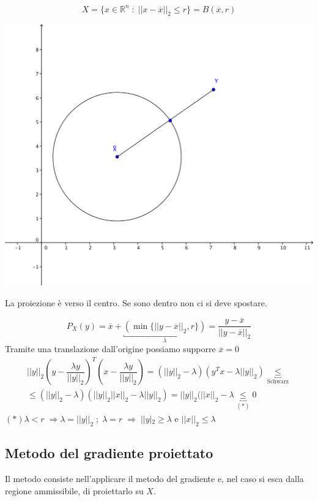 \begin{example}[Sfera]
$$
X  = \{ x \in \mathbb{R}^{n} \; : \;
|| x - \overline{x}||_{2} \leq r \} = B(\overline{x},r)
$$

\begin{center}
  \includegraphics[scale=0.6]{imgs/sferavincolo.png}
\end{center}

La proiezione \`e verso il centro.
Se sono dentro non ci si deve spostare.

$$P_{X}(y) = \overline{x} + \underbracket{(\min \{ || y - \overline{x}||_{2},r\})}_{\lambda} =
\dfrac{y-\overline{x}}{||y - \overline{x} ||_{2}}
$$
Tramite una translazione dall'origine possiamo supporre $\overline{x}=0$
$$
\begin{array}{l}
|| y||_{2} (y - \dfrac{\lambda y}{ ||y||_{2}})^{T}
(x - \dfrac{\lambda y}{ ||y||_{2}}) = 
(||y||_{2} - \lambda) (y^{T}x - \lambda ||y||_{2})
\underbracket{\leq}_{\text{Schwarz}} \\
\leq (||y||_{2}-\lambda)(||y||_{2} ||x||_{2} - \lambda||y||_{2})
= ||y||_{2} (||x||_{2} - \lambda \underbracket{\leq}_{(*)} 0 
\end{array}
$$
$ (*) \lambda <r \; \Rightarrow \lambda = ||y||_{2} \; ; \;
\lambda = r \; \Rightarrow \; ||y|_{2} \geq \lambda \text{ e }
||x||_{2} \leq \lambda 
 $
\end{example}

\subsection{Metodo del gradiente proiettato}
Il metodo consiste nell'applicare il metodo del gradiente e, nel caso
si esca dalla regione ammissibile, di proiettarlo su $X$.

